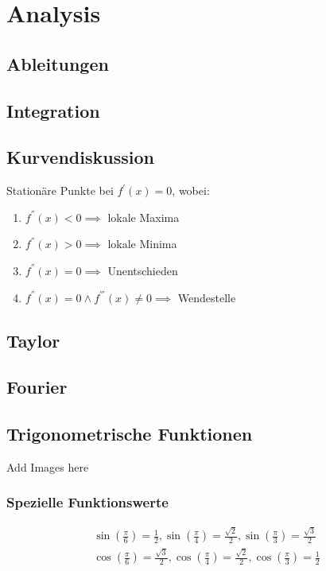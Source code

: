 \chapter{Analysis}
\section{Ableitungen}

\section{Integration}
\section{Kurvendiskussion}
Stationäre Punkte bei \(f^{'}(x)=0 \), wobei:
\begin{enumerate}
    \item \( f^{''}(x)<0 \implies\) lokale Maxima
    \item \( f^{''}(x)>0 \implies\) lokale Minima
    \item \( f^{''}(x)=0 \implies\) Unentschieden
    \item \( f^{''}(x)=0 \land f^{'''}(x) \neq 0 \implies\) Wendestelle
\end{enumerate}
\section{Taylor}
\section{Fourier}
\section{Trigonometrische Funktionen}
Add Images here
\subsection{Spezielle Funktionswerte}
\begin{equation}
    \begin{aligned}
        \sin(\frac{\pi}{6}) = \frac{1}{2},
        \sin(\frac{\pi}{4}) = \frac{\sqrt{2}}{2},
        \sin(\frac{\pi}{3}) = \frac{\sqrt{3}}{2} \\
        \cos(\frac{\pi}{6}) = \frac{\sqrt{3}}{2},
        \cos(\frac{\pi}{4}) = \frac{\sqrt{2}}{2},
        \cos(\frac{\pi}{3}) = \frac{1}{2}
    \end{aligned}
\end{equation}
